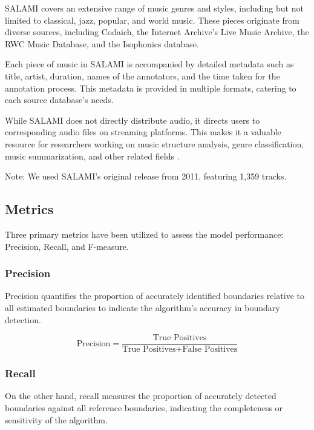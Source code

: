 SALAMI covers an extensive range of music genres and styles, including but not limited to classical, jazz, popular, and world music. These pieces originate from diverse sources, including Codaich, the Internet Archive's Live Music Archive, the RWC Music Database, and the Isophonics database.

Each piece of music in SALAMI is accompanied by detailed metadata such as title, artist, duration, names of the annotators, and the time taken for the annotation process. This metadata is provided in multiple formats, catering to each source database's needs.

While SALAMI does not directly distribute audio, it directs users to corresponding audio files on streaming platforms. This makes it a valuable resource for researchers working on music structure analysis, genre classification, music summarization, and other related fields \cite{Smith2011DESIGNANNOTATIONS}.

Note: We used SALAMI's original release from 2011, featuring 1,359 tracks.

\subsection{Metrics}

Three primary metrics have been utilized to assess the model performance: Precision, Recall, and F-measure. 

\subsubsection{Precision}

Precision quantifies the proportion of accurately identified boundaries relative to all estimated boundaries to indicate the algorithm's accuracy in boundary detection.

\begin{equation}
\text{Precision} = \frac{\text{True Positives}}{\text{True Positives} + \text{False Positives}}
\end{equation}

\subsubsection{Recall}

On the other hand, recall measures the proportion of accurately detected boundaries against all reference boundaries, indicating the completeness or sensitivity of the algorithm.

